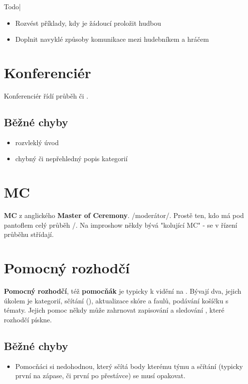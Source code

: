 \documentclass[main.tex]{subfiles}
\begin{document}
{{Todo| 
\begin{itemize}
\item  Rozvést příklady, kdy je žádoucí proložit  hudbou
\item  Doplnit navyklé způsoby komunikace mezi hudebníkem a hráčem
\end{itemize}
}} 
 
\needspace{5cm} \section{Konferenciér} \label{konferenciér} Konferenciér řídí průběh  či . 
 
\subsection{Běžné chyby} \begin{itemize}
\item rozvleklý úvod
\item chybný či nepřehledný popis kategorií
\end{itemize}
 
 
 
\needspace{5cm} \section{MC} \label{mc} \textbf{MC}{} z anglického \textbf{Master of Ceremony}{}. /moderátor/. Prostě ten, kdo má pod pantoflem celý průběh /. 
Na improshow někdy bývá "kolující MC"{} -  se v řízení průběhu střídají. 
 
 
\needspace{5cm} \section{Pomocný rozhodčí} \label{pomocný rozhodčí} \textbf{Pomocný rozhodčí}{}, též \textbf{pomocňák}{} je typicky k vidění na . 
Bývají dva, jejich úkolem je  kategorií, sčítání  (), aktualizace skóre a faulů, podávání košíčku s tématy. Jejich pomoc  někdy může zahrnovat zapisování a sledování , které rozhodčí pískne. 
\subsection{Běžné chyby} \begin{itemize}
\item Pomocňáci si nedohodnou, který sčítá body kterému týmu a sčítání (typicky první na zápase, či první po přestávce) se musí opakovat.
\end{itemize}
 
\end{document}
